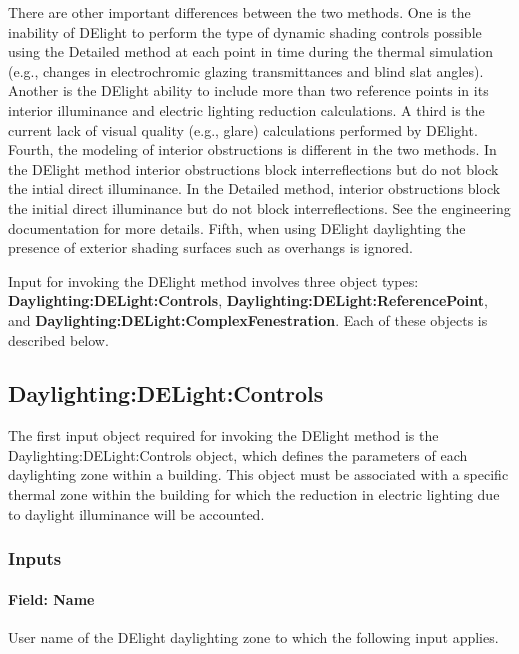 There are other important differences between the two methods. One is the inability of DElight to perform the type of dynamic shading controls possible using the Detailed method at each point in time during the thermal simulation (e.g., changes in electrochromic glazing transmittances and blind slat angles). Another is the DElight ability to include more than two reference points in its interior illuminance and electric lighting reduction calculations. A third is the current lack of visual quality (e.g., glare) calculations performed by DElight. Fourth, the modeling of interior obstructions is different in the two methods. In the DElight method interior obstructions block interreflections but do not block the intial direct illuminance. In the Detailed method, interior obstructions block the initial direct illuminance but do not block interreflections. See the engineering documentation for more details. Fifth, when using DElight daylighting the presence of exterior shading surfaces such as overhangs is ignored.

Input for invoking the DElight method involves three object types: \textbf{Daylighting:DELight:Controls}, \textbf{Daylighting:DELight:ReferencePoint}, and \textbf{Daylighting:DELight:ComplexFenestration}. Each of these objects is described below.

\subsection{Daylighting:DELight:Controls}\label{daylightingdelightcontrols}

The first input object required for invoking the DElight method is the Daylighting:DELight:Controls object, which defines the parameters of each daylighting zone within a building. This object must be associated with a specific thermal zone within the building for which the reduction in electric lighting due to daylight illuminance will be accounted.

\subsubsection{Inputs}\label{inputs-1-008}

\paragraph{Field: Name}\label{field-name-008}

User name of the DElight daylighting zone to which the following input applies.

